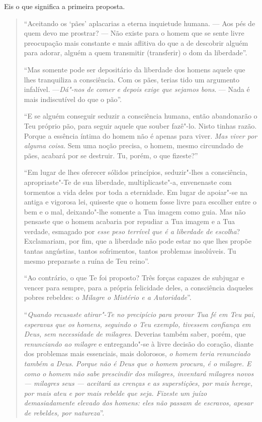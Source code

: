Eis o que significa a primeira proposta.

\begin{quote}
``Aceitando os `pães' aplacarias a eterna inquietude humana. --- Aos
pés de quem devo me prostrar? --- Não existe para o homem que se sente
livre preocupação mais constante e mais aflitiva do que a de descobrir
alguém para adorar, alguém a quem transmitir (transferir) o dom da
liberdade''.

``Mas somente pode ser depositário da liberdade dos homens aquele que
lhes tranquiliza a consciência. Com os pães, terias tido um argumento
infalível. ---\emph{Dá"-nos de comer e depois exige que sejamos bons}. 
--- Nada é mais indiscutível do que o pão''.

``E se alguém conseguir seduzir a consciência humana, então
abandonarão o Teu próprio pão, para seguir aquele que souber fazê"-lo.
Nisto tinhas razão. Porque a essência íntima do homem não é apenas para
viver. \emph{Mas viver por alguma coisa}. Sem uma noção precisa, o
homem, mesmo circundado de pães, acabará por se destruir. Tu, porém, o
que fizeste?''

``Em lugar de lhes oferecer sólidos princípios, seduzir"-lhes a
consciência, apropriaste"-Te de sua liberdade, multiplicaste"-a, envenenaste
com tormentos a vida deles por toda a eternidade. Em lugar de apoiar"-se
na antiga e vigorosa lei, quiseste que o homem fosse livre para escolher
entre o bem e o mal, deixando"-lhe somente a Tua imagem como guia. Mas
não pensaste que o homem acabaria por repudiar a Tua imagem e a Tua
verdade, esmagado por \emph{esse peso terrível que é a liberdade de
escolha}? Exclamariam, por fim, que a liberdade não pode estar no que
lhes propõe tantas angústias, tantos sofrimentos, tantos problemas
insolúveis. Tu mesmo preparaste a ruína de Teu reino''.

``Ao contrário, o que Te foi proposto? Três forças capazes de subjugar e
vencer para sempre, para a própria felicidade deles, a consciência
daqueles pobres rebeldes: o \emph{Milagre o Mistério e a Autoridade}''.

``\emph{Quando recusaste atirar"-Te no precipício para provar Tua fé em
Teu pai, esperavas que os homens, seguindo o Teu exemplo, tivessem
confiança em Deus, sem necessidade de milagres}. Deverias também saber,
porém, que \emph{renunciando ao milagre} e entregando"-se à livre
decisão do coração, diante dos problemas mais essenciais, mais
dolorosos, \emph{o homem teria renunciado também a Deus}.
\emph{Porque não é Deus que o homem procura, é o milagre. E
como o homem não sabe prescindir dos milagres, inventará milagres novos
--- milagres seus --- aceitará as crenças e as superstições, por mais
herege, por mais ateu e por mais rebelde que seja. Fizeste um juízo
demasiadamente elevado dos homens: eles não passam de escravos, apesar
de rebeldes, por natureza}''.


\end{quote}
